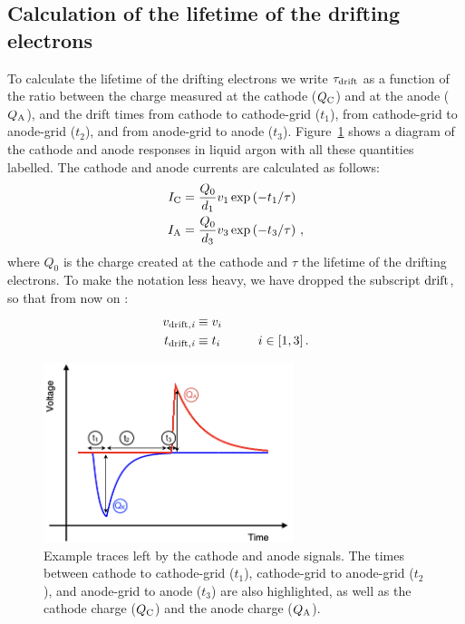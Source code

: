 \documentclass[a4paper,11pt]{article}
\newcommand{\QC}{\ensuremath{Q_{\rm C}}\xspace}
\newcommand{\QA}{\ensuremath{Q_{\rm A}}\xspace}
\newcommand{\IC}{\ensuremath{I_{\rm C}}\xspace}
\newcommand{\IA}{\ensuremath{I_{\rm A}}\xspace}
\begin{document}
\subsection{Calculation of the lifetime of the drifting electrons} \label{subsec:calculation_lifetime}
To calculate the lifetime of the drifting electrons we write $\tau_{\rm drift}$ as a function of the ratio between the charge measured at the cathode (\QC) and at the anode (\QA), and the drift times from cathode to cathode-grid ($t_1$), from cathode-grid to anode-grid ($t_2$), and from anode-grid to anode ($t_3$). 
Figure~\ref{fig:sampleLifetimeFunctions} shows a diagram of the cathode and anode responses in liquid argon with all these quantities labelled.
The cathode and anode currents are calculated as follows:
\begin{align}
    \IC & = \frac{Q_0}{d_1}v_{1}\exp\left({-t_{1}/\tau}\right) \\
    \IA & = \frac{Q_0}{d_3}v_{3}\exp\left({-t_{3}/\tau}\right) \,, 
\end{align}
\noindent where $Q_0$ is the charge created at the cathode and $\tau$ the lifetime of the drifting electrons. To make the notation less heavy, we have dropped the subscript $\rm drift$, so that from now on :
\begin{equation} 
    \begin{aligned}
    v_{\rm{drift},\textit{i}} & \equiv v_i \\ 
    t_{\rm{drift},\textit{i}} & \equiv t_i    \quad \quad \quad i \in [1,3] \,.
    \end{aligned}
\end{equation}

\begin{figure}[tb]
	\begin{center}
	\includegraphics[width=0.65\textwidth]{figures/LifetimeMeasurementSchematics.png}
	\caption{Example traces left by the cathode and anode signals. 
	    The times between cathode to cathode-grid ($t_1$), cathode-grid to anode-grid ($t_2$), and anode-grid to anode ($t_3$) are also highlighted, as well as the cathode charge (\QC) and the anode charge (\QA).}
	\label{fig:sampleLifetimeFunctions}
	\end{center}
\end{figure}
\end{document}
